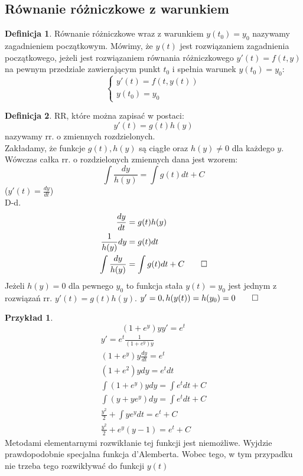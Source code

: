 \documentclass{article}
\theoremstyle{definition}
\newtheorem{de}{Definicja}[subsection]
\theoremstyle{definition}
\theoremstyle{definition}
\newtheorem{pk}{Przykład}[subsection]
\theoremstyle{definition}
\begin{document}
\subsection{Równanie różniczkowe z warunkiem}

\begin{de}
    Równanie różniczkowe wraz z warunkiem $y(t_0)=y_0$ nazywamy zagadnieniem początkowym.
    Mówimy, że $y(t)$ jest rozwiązaniem zagadnienia początkowego, jeżeli jest rozwiązaniem równania różniczkowego 
    $y'(t)=f(t,y)$ na pewnym przedziale zawierającym punkt $t_0$ i spełnia warunek $y(t_0)=y_0$:
    $$
    \begin{cases}
        y'(t) = f(t,y(t))\\
        y(t_0) = y_0
    \end{cases}
    $$
\end{de}

\begin{de}
    RR, które można zapisać w postaci: 
    \[y'(t)=g(t)h(y)\]
    nazywamy rr. o zmiennych rozdzielonych.\\
    Zakładamy, że funkcje $g(t), h(y)$ są ciągłe oraz $h(y)\neq 0$ dla każdego $y$. Wówczas całka rr. o rozdzielonych zmiennych dana jest wzorem:
    \[\int \frac{dy}{h(y)} = \int g(t) dt + C\]
    ($y'(t)=\frac{dy}{dt}$)\\
    D-d.\\
    \begin{align}
        \frac{dy}{dt} &= g(t)h(y)\\
        \frac{1}{h(y)} dy &= g(t)dt\\
        \int \frac{dy}{h(y)} &= \int g(t) dt + C\qed
    \end{align}
    Jeżeli $h(y)=0$ dla pewnego $y_0$ to funkcja stała $y(t)=y_0$ jest jednym z rozwiązań rr. $y'(t)=g(t)h(y)$.
    $y'=0, h(y(t))=h(y_0)=0\qed$
\end{de}

\begin{pk}
    \[(1+e^y)yy'=e^t\]
    \begin{align}
        y' = e^t \frac{1}{(1+e^y)y}\\
        (1+e^y)y\frac{dy}{dt} = e^t\\
        (1+e^2)y dy = e^t dt\\
        \int (1+e^y) y dy = \int e^t dt + C\\
        \int (y + ye^y) dy = \int e^t dt + C\\
        \frac{y^2}{2} + \int ye^y dt = e^t + C\\
        \frac{y^2}{2} + e^y(y-1) = e^t + C
    \end{align}
    Metodami elementarnymi rozwikłanie tej funkcji jest niemożliwe. Wyjdzie prawdopodobnie specjalna funkcja d'Alemberta.
    Wobec tego, w tym przypadku nie trzeba tego rozwikływać do funkcji $y(t)$
\end{pk}
\end{document}
